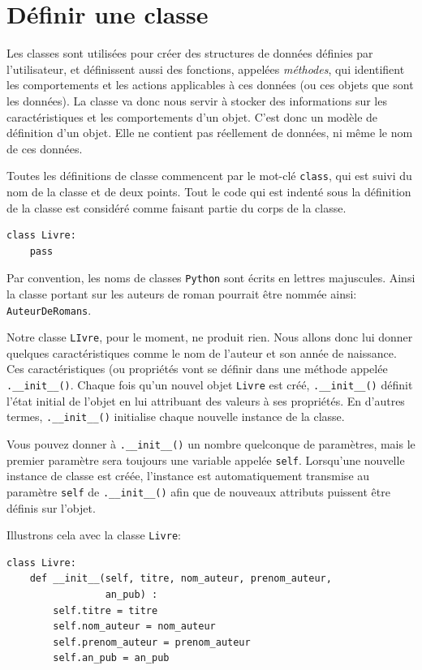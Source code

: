 \documentclass[a4paper,11pt]{book}
\begin{document}
\section{Définir une classe}
Les classes sont utilisées pour créer des structures de données définies par l'utilisateur, et définissent aussi des fonctions, appelées \textit{méthodes}, qui identifient les comportements et les actions applicables à ces données (ou ces objets que sont les données). La classe va donc nous servir à stocker des informations sur les caractéristiques et les comportements d'un objet. C'est donc un modèle de définition d'un objet. Elle ne contient pas réellement de données, ni même le nom de ces données.
\medskip

Toutes les définitions de classe commencent par le mot-clé \texttt{class}, qui est suivi du nom de la classe et de deux points. Tout le code qui est indenté sous la définition de la classe est considéré comme faisant partie du corps de la classe.
\begin{lstlisting}[caption=Définition d'une classe]
class Livre:
    pass
\end{lstlisting}
\medskip

Par convention, les noms de classes \texttt{Python} sont écrits en lettres majuscules. Ainsi la classe portant sur les auteurs de roman pourrait être nommée ainsi: \texttt{AuteurDeRomans}.
\medskip

Notre classe \texttt{LIvre}, pour le moment, ne produit rien. Nous allons donc lui donner quelques caractéristiques comme le nom de l'auteur et son année de naissance. Ces caractéristiques (ou propriétés vont se définir dans une méthode appelée \texttt{.\_\_init\_\_()}. Chaque fois qu'un nouvel objet \texttt{Livre} est créé, \texttt{.\_\_init\_\_()} définit l'état initial de l'objet en lui attribuant des valeurs à ses propriétés. En d'autres termes, \texttt{.\_\_init\_\_()} initialise chaque nouvelle instance de la classe.
\medskip

Vous pouvez donner à \texttt{.\_\_init\_\_()} un nombre quelconque de paramètres, mais le premier paramètre sera toujours une variable appelée \texttt{self}. Lorsqu'une nouvelle instance de classe est créée, l'instance est automatiquement transmise au paramètre \texttt{self} de \texttt{.\_\_init\_\_()} afin que de nouveaux attributs puissent être définis sur l'objet.
\medskip

Illustrons cela avec la classe \texttt{Livre}:
\begin{lstlisting}[caption=Initialisation avec la méthode \texttt{.\_\_init\_\_()}]
class Livre:
    def __init__(self, titre, nom_auteur, prenom_auteur, 
                 an_pub) :
		self.titre = titre
		self.nom_auteur = nom_auteur
		self.prenom_auteur = prenom_auteur
		self.an_pub = an_pub
\end{lstlisting}
\medskip
\end{document}
